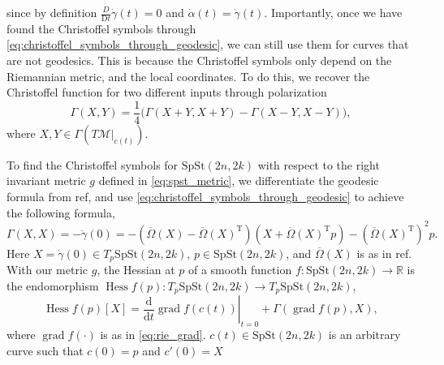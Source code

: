 since by definition $\tfrac{D}{\mathrm{D}t}\dot{\gamma}(t)=0$ and $\dot{\alpha}(t)=\dot{\gamma}(t)$. Importantly, once we have found the Christoffel symbols through \eqref{eq:christoffel_symbols_through_geodesic}, we can still use them for curves that are not geodesics. This is because the Christoffel symbols only depend on the Riemannian metric, and the local coordinates. To do this, we recover the Christoffel function for two different inputs through polarization \cite[p.~312]{Edelman1998} 
\begin{equation*}
    \Gamma(X,Y)=\frac{1}{4}\big(\Gamma(X+Y,X+Y)-\Gamma(X-Y,X-Y)\big),
\end{equation*}
where $X,Y\in \Gamma(T \mathcal{M}|_{c(t)})$. 


To find the Christoffel symbols for $\mathrm{SpSt}(2n, 2k)$ with respect to the right invariant metric $g$ defined in \eqref{eq:spst_metric}, we differentiate the geodesic formula from ref, and use \eqref{eq:christoffel_symbols_through_geodesic} to achieve the following formula,
$$\Gamma(X,X)=-\ddot{\gamma}(0)=-(\overline{\Omega}(X)-\overline{\Omega}(X)^{\mathrm{T}})(X+\overline{\Omega}(X)^{\mathrm{T}}p)-(\overline{\Omega}(X)^{\mathrm{T}})^{2}p.$$
Here $X=\dot{\gamma}(0)\in T_{p}\mathrm{SpSt}(2n, 2k)$, $p\in \mathrm{SpSt}(2n, 2k)$, and $\overline{\Omega}(X)$ is as in ref. 
With our metric $g$, the Hessian at $p$ of a smooth function $f:\mathrm{SpSt}(2n, 2k)\xrightarrow{}\mathbb{R}$ is the endomorphism $\operatorname{Hess}f(p):T_{p}\mathrm{SpSt}(2n, 2k)\xrightarrow{}T_{p}\mathrm{SpSt}(2n, 2k)$,
$$\operatorname{Hess}f(p)[X]=\left.\frac{\mathrm{d}}{\mathrm{d}t}\operatorname{grad}f(c(t))\right|_{t=0}+\Gamma(\operatorname{grad}f(p),X),$$
where $\operatorname{grad}f(\cdot)$ is as in \ref{eq:rie_grad}. $c(t)\in \mathrm{SpSt}(2n, 2k)$ is an arbitrary curve such that $c(0)=p$ and $c'(0)=X$ %